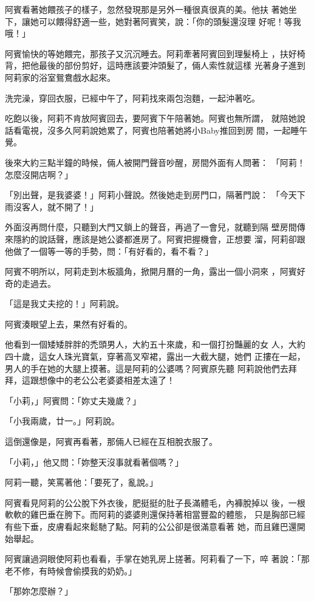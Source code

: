 阿賓看著她餵孩子的樣子，忽然發現那是另外一種很真很真的美。他扶
著她坐下，讓她可以餵得舒適一些，她對著阿賓笑，說：「你的頭髮還沒理
好呢！等我哦！」

阿賓愉快的等她餵完，那孩子又沉沉睡去。阿莉牽著阿賓回到理髮椅上
，扶好椅背，把他最後的部份剪好，這時應該要沖頭髮了，倆人索性就這樣
光著身子進到阿莉家的浴室鴛鴦戲水起來。

洗完澡，穿回衣服，已經中午了，阿莉找來兩包泡麵，一起沖著吃。

吃飽以後，阿莉不肯放阿賓回去，要阿賓下午陪著她。阿賓也無所謂，
就陪她說話看電視，沒多久阿莉說她累了，阿賓也陪著她將小Baby推回到房
間，一起睡午覺。

後來大約三點半鐘的時候，倆人被開門聲音吵醒，房間外面有人問著：
「阿莉！怎麼沒開店啊？」

「別出聲，是我婆婆！」阿莉小聲說。然後她走到房門口，隔著門說：
「今天下雨沒客人，就不開了！」

外面沒再問什麼，只聽到大門又鎖上的聲音，再過了一會兒，就聽到隔
壁房間傳來隱約的說話聲，應該是她公婆都進房了。阿賓把握機會，正想要
溜，阿莉卻跟他做了一個等一等的手勢，問：「有好看的，看不看？」

阿賓不明所以，阿莉走到木板牆角，掀開月曆的一角，露出一個小洞來
，阿賓好奇的走過去。

「這是我丈夫挖的！」阿莉說。

阿賓湊眼望上去，果然有好看的。

他看到一個矮矮胖胖的禿頭男人，大約五十來歲，和一個打扮豔麗的女
人，大約四十歲，這女人珠光寶氣，穿著高叉窄裙，露出一大截大腿，她們
正摟在一起，男人的手在她的大腿上摸著。這是阿莉的公婆嗎？阿賓原先聽
阿莉說他們去拜拜，這跟想像中的老公公老婆婆相差太遠了！

「小莉，」阿賓問：「妳丈夫幾歲？」

「小我兩歲，廿一。」阿莉說。

這倒還像是，阿賓再看著，那倆人已經在互相脫衣服了。

「小莉，」他又問：「妳整天沒事就看著個嗎？」

阿莉一聽，笑罵著他：「要死了，亂說。」

阿賓看見阿莉的公公脫下外衣後，肥挺挺的肚子長滿體毛，內褲脫掉以
後，一根軟軟的雞巴垂在胯下。而阿莉的婆婆則還保持著相當豐盈的體態，
只是胸部已經有些下垂，皮膚看起來鬆馳了點。阿莉的公公卻是很滿意看著
她，而且雞巴還開始舉起。

阿賓讓過洞眼使阿莉也看看，手掌在她乳房上搓著。阿莉看了一下，啐
著說：「那老不修，有時候會偷摸我的奶奶。」

「那妳怎麼辦？」

